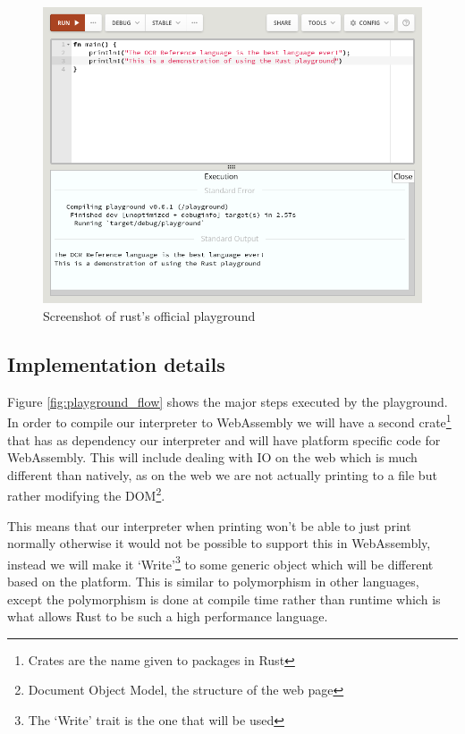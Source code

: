 \documentclass{article}
\begin{document}
\begin{figure}
	\includegraphics[width=\textwidth]{rust-playground}
	\caption{Screenshot of rust's official playground}
	\label{fig:rust-playground}
\end{figure}

\subsection{Implementation details}

Figure \ref{fig:playground_flow} shows the major steps executed by the
playground. In order to compile our interpreter to WebAssembly we will have a
second crate\footnote{Crates are the name given to packages in Rust} that has
as dependency our interpreter and will have platform specific code for
WebAssembly. This will include dealing with IO on the web which is much
different than natively, as on the web we are not actually printing to a file
but rather modifying the DOM\footnote{Document Object Model, the structure of
the web page}.

This means that our interpreter when printing won't be able to just print
normally otherwise it would not be possible to support this in WebAssembly,
instead we will make it `Write'\footnote{The `Write' trait is the one that will
be used} to some generic object which will be different based on the platform.
This is similar to polymorphism in other languages, except the polymorphism is
done at compile time rather than runtime which is what allows Rust to be such a
high performance language.
\end{document}
